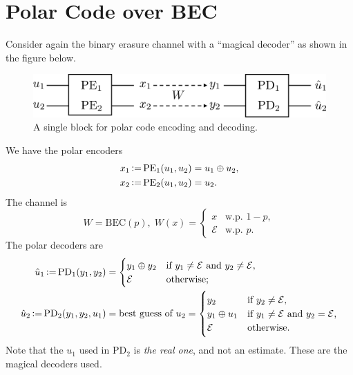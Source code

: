 \section{Polar Code over BEC}
Consider again the binary erasure channel with a ``magical decoder'' as shown in the figure below.
\begin{figure}[H]
    \centering
    \includegraphics[width=0.6\linewidth]{figures/w2_split_channel.png}
    \caption{A single block for polar code encoding and decoding.}
\end{figure}
We have the polar encoders
\begin{equation}\begin{aligned}
    x_1\operatorname{\vcentcolon=} \mathrm{PE}_1(u_1,u_2) &= u_1 \oplus u_2, \\
    x_2\operatorname{\vcentcolon=} \mathrm{PE}_2(u_1,u_2) &= u_2.
\end{aligned}\end{equation}
The channel is
\begin{equation}
    W=\mathrm{BEC}(p),\; W(x)=\begin{cases}
        x &\text{w.p. } 1-p,\\
        \mathcal{E} &\text{w.p. } p.
    \end{cases}
\end{equation}
The polar decoders are
\begin{equation}\begin{aligned}
    \hat{u}_1\operatorname{\vcentcolon=} \mathrm{PD}_1(y_1,y_2) &= \begin{cases}
        y_1 \oplus y_2 &\text{if $y_1\neq\mathcal{E}$ and $y_2\neq\mathcal{E}$}, \\
        \mathcal{E} &\text{otherwise;}
    \end{cases} \\
    \hat{u}_2\operatorname{\vcentcolon=} \mathrm{PD}_2(y_1,y_2,u_1) &= \text{best guess of $u_2$}= \begin{cases}
        y_2 &\text{if $y_2\neq\mathcal{E}$,}\\
        y_1\oplus u_1 &\text{if $y_1\neq\mathcal{E}$ and $y_2=\mathcal{E}$,}\\
        \mathcal{E} &\text{otherwise.}
    \end{cases}
\end{aligned}\end{equation}
Note that the $u_1$ used in $\mathrm{PD}_2$ is \textit{the real one}, and not an estimate. These are the magical decoders used.

